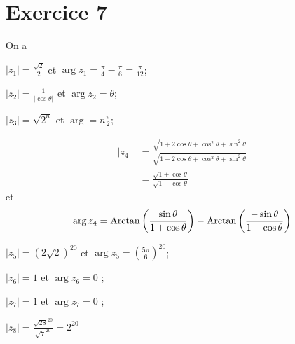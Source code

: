 \part{Exercice 7}

On a

\begin{multicols}{2}
	$|z_1| = \frac{\sqrt{2}}{2}$ et $\arg z_1 = \frac{\pi}{4} - \frac{\pi}{6} = \frac{\pi}{12}$;

	$|z_2| = \frac{1}{|\cos \theta|}$ et $\arg z_2 = \theta$;

	$|z_3| = \sqrt{2^n}$ et $\arg = n\frac{\pi}{2}$;

	\begin{align*}
		|z_4| &= \frac{\sqrt{1 + 2\cos \theta + \cos^2\theta + \sin^2 \theta}}{\sqrt{1 - 2\cos \theta + \cos^2\theta + \sin^2 \theta}}\\
					&= \frac{\sqrt{1+\cos\theta}}{\sqrt{1-\cos\theta}}
	\end{align*}
	et 
	\begin{align*}
		\arg z_4 &= \operatorname{Arctan}\left(\frac{\sin \theta}{1 + \cos \theta}\right) - \operatorname{Arctan}\left(\frac{-\sin \theta}{1 - \cos\theta}\right)\\
	\end{align*}

	$|z_5| = \left(2\sqrt{2}\right)^{20}$ et $\arg z_5 = \left( \frac{5\pi}{6} \right)^{20}$;

	$|z_6| = 1$ et $\arg z_6 = 0$ ;

	$|z_7| = 1$ et $\arg z_7 = 0$ ;

	$|z_8| =\frac{\sqrt{28}^{20}}{\sqrt{7}^{20}} = 2^{20}$
\end{multicols}

